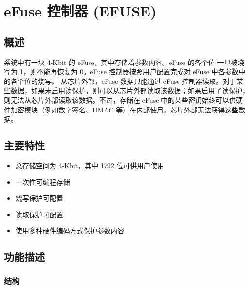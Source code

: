 \documentclass[main\_\_CN.tex]{subfiles}
\begin{document}

\ifglobal
\else
    {\let\clearpage\relax \listoftodos}
    \tableofcontents
\fi




\hypertarget{efuse}{}
\chapter{eFuse 控制器 (EFUSE)}
\label{mod:efuse}

\section{概述}

\chipname{} 系统中有一块 4-Kbit 的 eFuse，其中存储着参数内容。eFuse 的各个位 一旦被烧写为 1，则不能再恢复为 0。eFuse 控制器按照用户配置完成对 eFuse 中各参数中的各个位的烧写。
从芯片外部，eFuse 数据只能通过 eFuse 控制器读取。对于某些数据，如果未启用读保护，则可以从芯片外部读取该数据；如果启用了读保护，则无法从芯片外部读取该数据。不过，存储在 eFuse 中的某些密钥始终可以供硬件加密模块（例如数字签名、HMAC 等）在内部使用，芯片外部无法获得这些数据。



\section{主要特性}

\begin{itemize}
    \item 总存储空间为 4-Kbit，其中 1792 位可供用户使用
    \item 一次性可编程存储
    \item 烧写保护可配置
    \item 读取保护可配置
    \item 使用多种硬件编码方式保护参数内容
\end{itemize}


\section{功能描述}

\subsection{结构}
\end{document}
